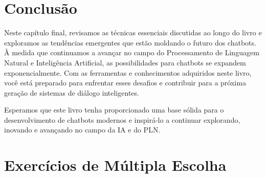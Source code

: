 \documentclass[14pt,a4paper,oneside]{book}
\begin{document}
\section{Conclusão}

Neste capítulo final, revisamos as técnicas essenciais discutidas ao longo do livro e exploramos as tendências emergentes que estão moldando o futuro dos chatbots. À medida que continuamos a avançar no campo do Processamento de Linguagem Natural e Inteligência Artificial, as possibilidades para chatbots se expandem exponencialmente. Com as ferramentas e conhecimentos adquiridos neste livro, você está preparado para enfrentar esses desafios e contribuir para a próxima geração de sistemas de diálogo inteligentes.

Esperamos que este livro tenha proporcionado uma base sólida para o desenvolvimento de chatbots modernos e inspirá-lo a continuar explorando, inovando e avançando no campo da IA e do PLN.

\section*{Exercícios de Múltipla Escolha}
\end{document}
